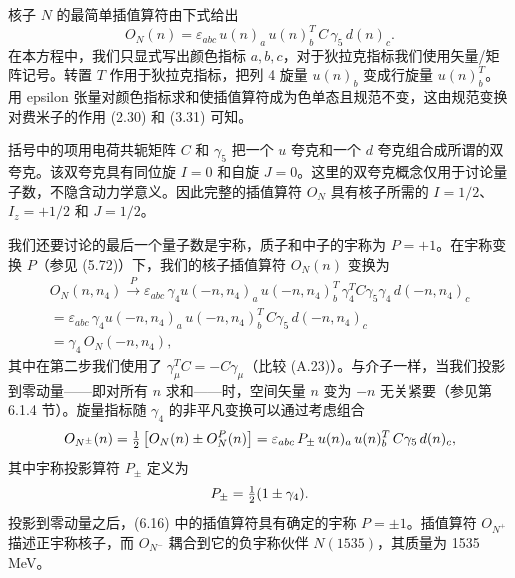 核子 $N$ 的最简单插值算符由下式给出
\begin{equation}
  O_N(n) = \varepsilon_{abc}\, u(n)_a\, u(n)_b^T\, C\, \gamma_5\, d(n)_c .
\end{equation}
在本方程中，我们只显式写出颜色指标 $a, b, c$，对于狄拉克指标我们使用矢量/矩阵记号。转置 $T$ 作用于狄拉克指标，把列 4 旋量 $u(n)_b$ 变成行旋量 $u(n)_b^T$。用 epsilon 张量对颜色指标求和使插值算符成为色单态且规范不变，这由规范变换对费米子的作用 (2.30) 和 (3.31) 可知。

括号中的项用电荷共轭矩阵 $C$ 和 $\gamma_5$ 把一个 $u$ 夸克和一个 $d$ 夸克组合成所谓的双夸克。该双夸克具有同位旋 $I = 0$ 和自旋 $J = 0$。这里的双夸克概念仅用于讨论量子数，不隐含动力学意义。因此完整的插值算符 $O_N$ 具有核子所需的 $I = 1/2$、$I_z = +1/2$ 和 $J = 1/2$。

我们还要讨论的最后一个量子数是宇称，质子和中子的宇称为 $P = +1$。在宇称变换 $P$（参见 (5.72)）下，我们的核子插值算符 $O_N(n)$ 变换为
\begin{multline}
  O_N(n, n_4) \xrightarrow{\;P\;} \varepsilon_{abc}\,
    \gamma_4 u(-n, n_4)_a\, u(-n, n_4)_b^T\, \gamma_4^T C\gamma_5\gamma_4\,
    d(-n, n_4)_c \\
  = \varepsilon_{abc}\, \gamma_4 u(-n, n_4)_a\, u(-n, n_4)_b^T\, C\gamma_5\,
    d(-n, n_4)_c \\
  = \gamma_4\, O_N(-n, n_4) ,
\end{multline}
其中在第二步我们使用了 $\gamma_\mu^T C = -C\gamma_\mu$（比较 (A.23)）。与介子一样，当我们投影到零动量——即对所有 $n$ 求和——时，空间矢量 $n$ 变为 $-n$ 无关紧要（参见第 6.1.4 节）。旋量指标随 $\gamma_4$ 的非平凡变换可以通过考虑组合
\begin{equation}
  O_{N^\pm}(n) = \tfrac{1}{2}\left[ O_N(n) \pm O_N^P(n) \right]
  = \varepsilon_{abc}\, P_\pm\, u(n)_a\, u(n)_b^T\, C\gamma_5\, d(n)_c ,
\end{equation}
其中宇称投影算符 $P_\pm$ 定义为
\begin{equation}
  P_\pm = \tfrac{1}{2} (1 \pm \gamma_4) .
\end{equation}
投影到零动量之后，(6.16) 中的插值算符具有确定的宇称 $P = \pm 1$。插值算符 $O_{N^+}$ 描述正宇称核子，而 $O_{N^-}$ 耦合到它的负宇称伙伴 $N(1535)$，其质量为 1535\,MeV。

